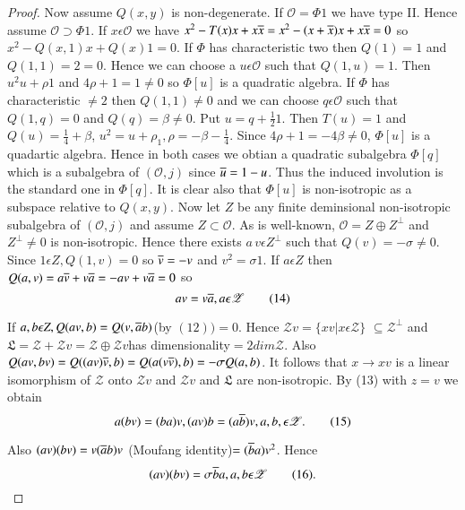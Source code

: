 \begin{proof}
Now assume $Q(x,y)$ is non-degenerate. If $\mathscr{O}=\Phi 1$ we have
type II. Hence assume $\mathscr{O}\supset\Phi 1$. If $x\epsilon
\mathscr{O}$ we have $x^{2}-T(x)x+x\overline{x}=x^{2}-(x+\overline{x})x+x\overline{x}=0$
so $x^{2}-Q(x,1)x+Q(x)1=0$. If $\Phi$ has characteristic two then
$Q(1)=1$ and $Q(1,1)=2=0$. Hence we can choose a $u\epsilon
\mathscr{O}$ such that $Q(1,u)=1$. Then $u^{2}u+\rho 1$ and $4\rho
+1=1\neq 0$  so $\Phi[u]$ is a quadratic algebra. If $\Phi$ has
characteristic $\neq 2$ then $Q(1,1)\neq 0$ and we can choose
$q\epsilon \mathscr{O}$ such that $Q(1,q)=0$ and $Q(q)=\beta\neq
0$. Put $u=q+\frac{1}{2}1$. Then $T(u)=1$ and
$Q(u)=\frac{1}{4}+\beta$,
$u^{2}=u+\rho_1,\rho=-\beta-\frac{1}{4}$. Since $4\rho +1=-4\beta \neq
0$, $\Phi[u]$ is a quadartic algebra. Hence in both cases we obtian a
quadratic subalgebra $\Phi[q]$ which is a subalgebra of
$(\mathscr{O},j)$ since $\overline{u}=1-u$. Thus the induced involution is
the standard one in $\Phi[q]$. It is clear also that $\Phi[u]$ is
non-isotropic as a subspace relative to $Q(x,y)$. Now let
$Z$ be any  finite deminsional non-isotropic subalgebra of
$(\mathscr{O},j)$ and assume $Z\subset \mathscr{O}$. As is
well-known, $\mathscr{O}=Z\oplus Z^{\bot}$ and
$Z^{\bot}\neq 0$ is non-isotropic. Hence there exists
$a\,v\epsilon Z^{\bot}$ such that $Q(v)=-\sigma\neq 0$. Since
$1\epsilon Z,Q(1,v)=0$ so $\overline{v}=-v$ and $v^{2}=\sigma
1$. If $a\epsilon Z$ then
$Q(a,v)=a\overline{v}+v\overline{a}=-av+v\overline{a}=0$ so 
\begin{equation*}
  av=v\overline{a},a\epsilon \mathscr{Z}\tag{14}\label{c3:eq14}
\end{equation*}

If $a,b\epsilon Z, Q(av,b)=Q(v,\overline{a}b)$(by
$(12))=0$. Hence $\mathscr{Z}v=\{xv|x\epsilon \mathscr{Z}\}$ $\subseteq
\mathscr{Z}^{\bot}$ and
$\mathfrak{L}=\mathscr{Z}+\mathscr{Z}v=\mathscr{Z}\oplus
\mathscr{Z}v$\pageoriginale has dimensionality$=2dim
\mathscr{Z}$. Also $Q(av, bv)=Q((av)\overline{v},b)=Q(a(v\overline{v}),b)=-\sigma
Q(a,b)$. It follows that $x\to xv$ is a linear isomorphism of
$\mathscr{Z}$ onto $\mathscr{Z}v$ and $\mathscr{Z}v$ and
$\mathfrak{L}$ are non-isotropic. By (13) with $z=v$ we obtain
\begin{equation*}
  a(bv)=(ba)v,(av)b=(a\overline{b})v,a,b,\epsilon
  \mathscr{Z}.\tag{15}\label{c3:eq15} 
\end{equation*}

Also $(av)(bv)=v(\overline{a}b)v$ (Moufang identity)$=(\overline{b}a)v^{2}$. Hence
\begin{equation*}
  (av)(bv)=\sigma \overline{b}a,a,b\epsilon \mathscr{Z}\tag{16}.\label{c3:eq16}
\end{equation*}


\end{proof}
